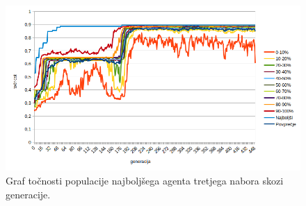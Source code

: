 %

\begin{figure}[H]
    \begin{center}
        \includegraphics[width=13cm]{wine/3/acc}
    \end{center}
    \caption{Graf točnosti populacije najboljšega agenta tretjega nabora skozi generacije.}
    \label{fig:wine_acc_3}
\end{figure}

